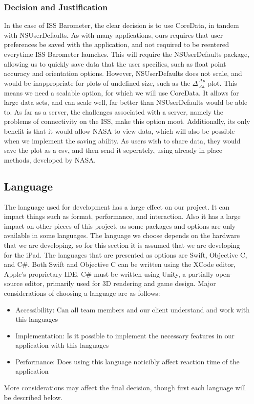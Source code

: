\documentclass[onecolumn, draftclsnofoot,10pt, compsoc]{IEEEtran}
\begin{document}
\subsubsection{Decision and Justification}
In the case of ISS Barometer, the clear decision is to use CoreData, in tandem with NSUserDefaults.
As with many applications, ours requires that user preferences be saved with the application, and not required to be reentered everytime ISS Barometer launches.
This will require the NSUserDefaults package, allowing us to quickly save data that the user specifies, such as float point accuracy and orientation options.
However, NSUserDefaults does not scale, and would be inappropriate for plots of undefined size, such as the $\Delta \frac{\Delta p}{\Delta t}$ plot.
This means we need a scalable option, for which we will use CoreData.
It allows for large data sets, and can scale well, far better than NSUserDefaults would be able to.
As far as a server, the challenges associated with a server, namely the problems of connectivity on the ISS, make this option moot.
Additionally, its only benefit is that it would allow NASA to view data, which will also be possible when we implement the saving ability.
As users wish to share data, they would save the plot as a csv, and then send it seperately, using already in place methods, developed by NASA.

\subsection{Language}
The language used for development has a large effect on our project.
It can impact things such as format, performance, and interaction.
Also it has a large impact on other pieces of this project, as some packages and options are only available in some languages.
The language we choose depends on the hardware that we are developing, so for this section it is assumed that we are developing for the iPad.
The languages that are presented as options are Swift, Objective C, and C\#.
Both Swift and Objective C can be written using the XCode editor, Apple's proprietary IDE.
C\# must be written using Unity, a partially open-source editor, primarily used for 3D rendering and game design.
Major considerations of choosing a language are as follows:
\begin{itemize}
	\item Accessibility: Can all team members and our client understand and work with this languages
	\item Implementation: Is it possible to implement the necessary features in our application with this languages
	\item Performance: Does using this language noticibly affect reaction time of the application
\end{itemize}
More considerations may affect the final decision, though first each language will be described below.
\end{document}
